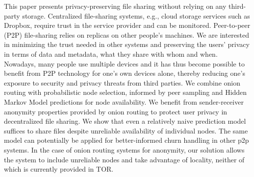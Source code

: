 
This paper presents privacy-preserving file sharing without relying on any third-party storage. 
Centralized file-sharing systems, e.g.,  cloud storage services such as Dropbox, require trust in the service provider and can be monitored. Peer-to-peer (P2P) file-sharing relies on replicas on other people's machines. We are interested in minimizing the trust needed in other systems and preserving the users' privacy in terms of data and metadata, what they share with whom and when.
Nowadays, many people use multiple devices and it has thus become possible to benefit from P2P technology for one's own devices alone, thereby reducing one's exposure to security and privacy threats from third parties.
We combine onion routing with probabilistic node selection, informed by peer sampling and Hidden Markov Model predictions for node availability.
We benefit from sender-receiver anonymity properties provided by onion routing to protect user privacy in decentralized file sharing. We show that even a relatively naive prediction model suffices to share files despite unreliable availability of individual nodes. The same model can potentially be applied for better-informed churn handling in other p2p systems. In the case of onion routing systems for anonymity, our solution allows the system to include unreliable nodes and take advantage of locality, neither of which is currently provided in TOR.

